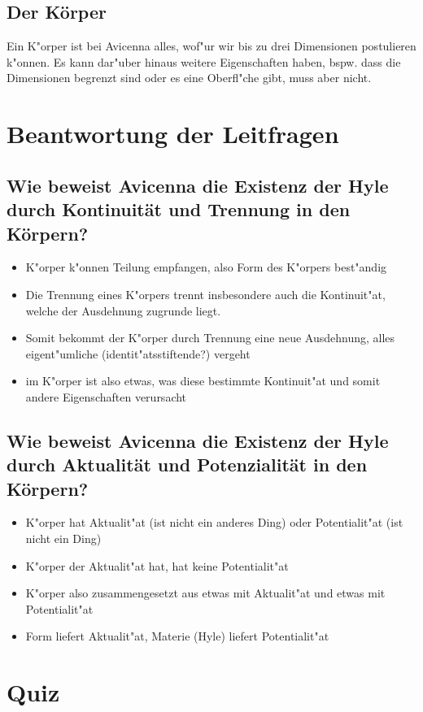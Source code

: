 \documentclass[a4paper,12pt]{article}
\begin{document}
	\subsection{Der Körper}
		Ein K"orper ist bei Avicenna alles, wof"ur wir bis zu drei Dimensionen postulieren k"onnen. Es kann dar"uber hinaus weitere Eigenschaften haben, bspw. dass die Dimensionen begrenzt sind oder es eine Oberfl"che gibt, muss aber nicht.
	
\section{Beantwortung der Leitfragen}
\subsection{Wie beweist Avicenna die Existenz der Hyle durch Kontinuität und Trennung in den Körpern?}
\begin{itemize}
	\item K"orper k"onnen Teilung empfangen, also Form des K"orpers best"andig
	\item Die Trennung eines K"orpers trennt insbesondere auch die Kontinuit"at, welche der Ausdehnung zugrunde liegt.
	\item Somit bekommt der K"orper durch Trennung eine neue Ausdehnung, alles eigent"umliche (identit"atsstiftende?) vergeht
	\item im K"orper ist also etwas, was diese bestimmte Kontinuit"at und somit andere Eigenschaften verursacht
\end{itemize}

\subsection{Wie beweist Avicenna die Existenz der Hyle durch Aktualität und Potenzialität in den Körpern?}
\begin{itemize}
	\item K"orper hat Aktualit"at (ist nicht ein anderes Ding) oder Potentialit"at (ist nicht ein Ding)
	\item K"orper der Aktualit"at hat, hat keine Potentialit"at
	\item K"orper also zusammengesetzt aus etwas mit Aktualit"at und etwas mit Potentialit"at
	\item Form liefert Aktualit"at, Materie (Hyle) liefert Potentialit"at
\end{itemize}


\section{Quiz}
\end{document}
